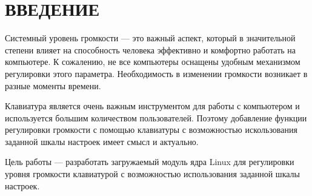 \chapter*{ВВЕДЕНИЕ}

Системный уровень громкости --- это важный аспект, который в значительной степени влияет на способность человека эффективно и комфортно работать на компьютере. К сожалению, не все компьютеры оснащены удобным механизмом регулировки этого параметра. Необходимость в изменении громкости возникает в разные моменты времени.

Клавиатура является очень важным инструментом для работы с компьютером и используется большим количеством пользователей. Поэтому добавление функции регулировки громкости с помощью клавиатуры с возможностью искользования заданной шкалы настроек имеет смысл и актуально.

Цель работы --- разработать загружаемый модуль ядра Linux для
регулировки уровня громкости клавиатурой с возможностью использования
заданной шкалы настроек.
